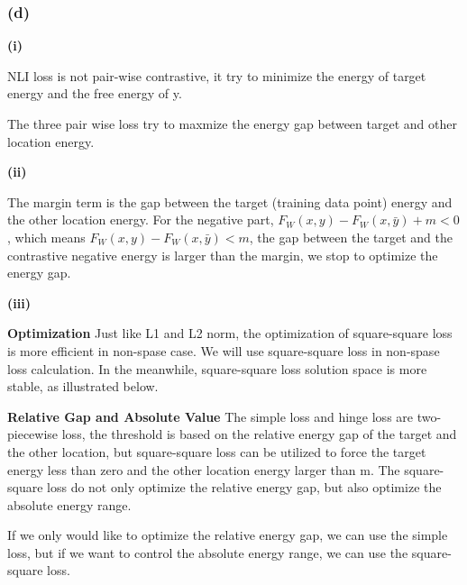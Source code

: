 \subsubsection*{(d)}
\textbf{(i)}

NLI loss is not pair-wise contrastive, it try to minimize the energy of target energy and the free energy of y.

The three pair wise loss try to maxmize the energy gap between target and other location energy.

\textbf{(ii)}

The margin term is the gap between the target (training data point) energy and the other location energy. For the negative part, $F_W(x, y) - F_W(x, \bar y) + m <0$, which means $F_W(x, y) - F_W(x, \bar y) <m$, the gap between the target and the contrastive negative energy is larger than the margin, we stop to optimize the energy gap.

\textbf{(iii)}

\textbf{Optimization}
Just like L1 and L2 norm, the optimization of square-square loss is more efficient in non-spase case. We will use square-square loss in non-spase loss calculation. In the meanwhile, square-square loss solution space is more stable, as illustrated below.

\textbf{Relative Gap and Absolute Value}
The simple loss and hinge loss are two-piecewise loss, the threshold is based on the relative energy gap of the target and the other location, but square-square loss can be utilized to force the target energy less than zero and the other location energy larger than m. The square-square loss do not only optimize the relative energy gap, but also optimize the absolute energy range.

If we only would like to optimize the relative energy gap, we can use the simple loss, but if we want to control the absolute energy range, we can use the square-square loss.
